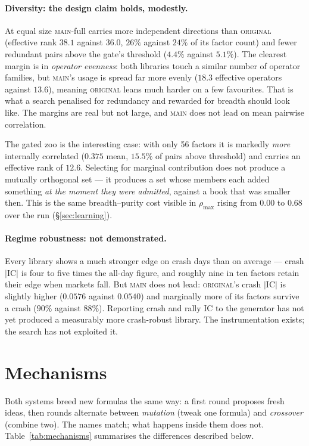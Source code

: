 \documentclass[11pt]{article}
\newcommand{\main}{\textsc{main}}
\newcommand{\orig}{\textsc{original}}
\begin{document}
\paragraph{Diversity: the design claim holds, modestly.}
At equal size \main{}-full carries more independent directions than \orig{}
(effective rank $38.1$ against $36.0$, $26\%$ against $24\%$ of its factor count) and
fewer redundant pairs above the gate's threshold ($4.4\%$ against $5.1\%$). The
clearest margin is in \emph{operator evenness}: both libraries touch a similar number
of operator families, but \main{}'s usage is spread far more evenly ($18.3$ effective
operators against $13.6$), meaning \orig{} leans much harder on a few favourites.
That is what a search penalised for redundancy and rewarded for breadth should look
like. The margins are real but not large, and \main{} does not lead on mean pairwise
correlation.

The gated zoo is the interesting case: with only 56 factors it is markedly
\emph{more} internally correlated ($0.375$ mean, $15.5\%$ of pairs above threshold)
and carries an effective rank of $12.6$. Selecting for marginal contribution does not
produce a mutually orthogonal set --- it produces a set whose members each added
something \emph{at the moment they were admitted}, against a book that was smaller
then. This is the same breadth--purity cost visible in $\rho_{\max}$ rising from
$0.00$ to $0.68$ over the run (\S\ref{sec:learning}).

\paragraph{Regime robustness: not demonstrated.}
Every library shows a much stronger edge on crash days than on average --- crash
$|$IC$|$ is four to five times the all-day figure, and roughly nine in ten factors
retain their edge when markets fall. But \main{} does not lead: \orig{}'s crash
$|$IC$|$ is slightly higher ($0.0576$ against $0.0540$) and marginally more of its
factors survive a crash ($90\%$ against $88\%$). Reporting crash and rally IC to the
generator has not yet produced a measurably more crash-robust library. The
instrumentation exists; the search has not exploited it.

\section{Mechanisms}
\label{sec:mechanisms}

Both systems breed new formulas the same way: a first round proposes fresh ideas, then
rounds alternate between \emph{mutation} (tweak one formula) and \emph{crossover}
(combine two). The names match; what happens inside them does not.
Table~\ref{tab:mechanisms} summarises the differences described below.
\end{document}
